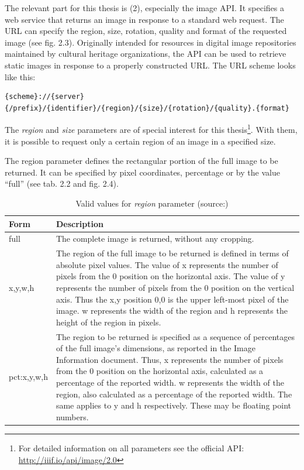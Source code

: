 The relevant part for this thesis is (2), especially the image API\cite{web:iiif}. It specifies a web service that returns an image in response to a standard web request. The URL can specify the region, size, rotation, quality and format of the requested image (see fig. 2.3). Originally intended for resources in digital image repositories maintained by cultural heritage organizations, the API can be used to retrieve static images in response to a properly constructed URL\cite{web:openseadragon}. The URL scheme looks like this\cite{web:iiif}:
\begin{lstlisting}
{scheme}://{server}{/prefix}/{identifier}/{region}/{size}/{rotation}/{quality}.{format}
\end{lstlisting}

The \emph{region} and \emph{size} parameters are of special interest for this thesis\footnote{For detailed information on all parameters see the official API: \url{http://iiif.io/api/image/2.0}}. With them, it is possible to request only a certain region of an image in a specified size.

The region parameter defines the rectangular portion of the full image to be returned. It can be specified by pixel coordinates, percentage or by the value “full” (see tab. 2.2 and fig. 2.4).

\begin{table}[H]
	\begin{center}
		\begin{tabular}{| p{2cm} | p{9cm} |}
			\hline
			\textbf{Form} & \textbf{Description}\\ \hline
			full & The complete image is returned, without any cropping.\\ \hline
			x,y,w,h & The region of the full image to be returned is defined in terms of absolute pixel values. The value of x represents the number of pixels from the 0 position on the horizontal axis. The value of y represents the number of pixels from the 0 position on the vertical axis. Thus the x,y position 0,0 is the upper left-most pixel of the image. w represents the width of the region and h represents the height of the region in pixels.\\ \hline
			pct:x,y,w,h & The region to be returned is specified as a sequence of percentages of the full image’s dimensions, as reported in the Image Information document. Thus, x represents the number of pixels from the 0 position on the horizontal axis, calculated as a percentage of the reported width. w represents the width of the region, also calculated as a percentage of the reported width. The same applies to y and h respectively. These may be floating point numbers.\\ \hline
		\end{tabular}
		\caption{Valid values for \emph{region} parameter (source:\cite{web:iiif})}
	\end{center}
\end{table}

